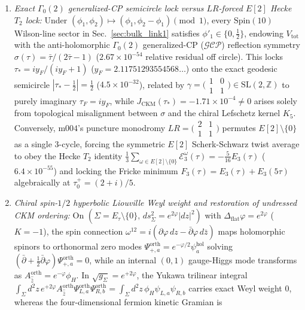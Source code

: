 \documentclass[aps,prd,twocolumn,nofootinbib,floatfix]{revtex4-2}
\begin{document}
\begin{enumerate}
    \item \emph{Exact $\Gamma_0(2)$ generalized-CP semicircle lock versus $LR$-forced $E[2]$ Hecke $T_2$ lock:} Under $(\phi_1,\phi_2) \mapsto (\phi_1,\phi_2-\phi_1) \pmod 1$, every $\mathrm{Spin}(10)$ Wilson-line sector in Sec.~\ref{sec:bulk_link1} satisfies $\phi'_1 \in \{0,\frac{1}{2}\}$, endowing $V_{\mathrm{tot}}$ with the anti-holomorphic $\Gamma_0(2)$ generalized-CP ($\mathcal{GCP}$) reflection symmetry $\sigma(\tau) = \bar{\tau}/(2\bar{\tau}-1)$ ($2.67\times 10^{-54}$ relative residual off circle). This locks $\tau_* = i y_F/(i y_F + 1)$ ($y_F = 2.11751293554568\dots$) onto the exact geodesic semicircle $|\tau_* - \frac{1}{2}| = \frac{1}{2}$ ($4.5\times 10^{-32}$), related by $\gamma = \bigl(\begin{smallmatrix} 1 & 0 \\ 1 & 1 \end{smallmatrix}\bigr) \in \mathrm{SL}(2,\mathbb{Z})$ to purely imaginary $\tau_F = i y_F$, while $J_{\mathrm{CKM}}(\tau_*) = -1.71\times 10^{-4} \ne 0$ arises solely from topological misalignment between $\sigma$ and the chiral Lefschetz kernel $K_5$. Conversely, $\mathrm{m004}$'s puncture monodromy $LR = \bigl(\begin{smallmatrix} 2 & 1 \\ 1 & 1 \end{smallmatrix}\bigr)$ permutes $E[2]\setminus\{0\}$ as a single $3$-cycle, forcing the symmetric $E[2]$ Scherk-Schwarz twist average to obey the Hecke $T_2$ identity $\frac{1}{3}\sum_{\omega\in E[2]\setminus\{0\}}\mathcal{E}_3^\omega(\tau) = -\frac{5}{16}E_3(\tau)$ ($6.4\times 10^{-55}$) and locking the Fricke minimum $F_3(\tau) = E_3(\tau)+E_3(5\tau)$ algebraically at $\tau_0^+ = (2+i)/5$.
    \item \emph{Chiral spin-$1/2$ hyperbolic Liouville Weyl weight and restoration of undressed CKM ordering:} On $(\Sigma = E_\tau\setminus\{0\},\, ds_\Sigma^2 = e^{2\varphi}|dz|^2)$ with $\Delta_{\mathrm{flat}}\varphi = e^{2\varphi}$ ($K = -1$), the spin connection $\omega^{12} = i(\partial\varphi\,dz - \bar{\partial}\varphi\,d\bar{z})$ maps holomorphic spinors to orthonormal zero modes $\Psi_{+,a}^{\mathrm{orth}} = e^{-\varphi/2}\psi_a^{\mathrm{hol}}$ solving $(\bar{\partial} + \frac{1}{2}\bar{\partial}\varphi)\Psi_{+,a}^{\mathrm{orth}} = 0$, while an internal $(0,1)$ gauge-Higgs mode transforms as $A_{\hat{\bar{z}}}^{\mathrm{orth}} = e^{-\varphi}\phi_H$. In $\sqrt{g_\Sigma} = e^{+2\varphi}$, the Yukawa trilinear integral $\int_\Sigma d^2z\,e^{+2\varphi}A_{\hat{\bar{z}}}^{\mathrm{orth}}\Psi_{L,a}^{\mathrm{orth}}\Psi_{R,b}^{\mathrm{orth}} = \int_\Sigma d^2z\,\phi_H\psi_{L,a}\psi_{R,b}$ carries exact Weyl weight $0$, whereas the four-dimensional fermion kinetic Gramian is

\end{enumerate}
\end{document}
